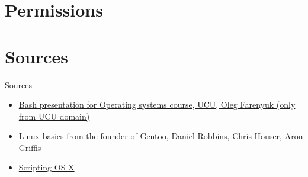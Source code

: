 \documentclass[usenames,dvipsnames,10pt,aspectratio=169]{beamer}
\begin{document}
\section{Permissions}

\section{Sources}
\begin{frame}{Sources}
\begin{itemize}
    \item \href{https://cms.ucu.edu.ua/pluginfile.php/181565/mod_resource/content/3/os_p01_bash.pdf}{Bash presentation for Operating systems course, UCU, Oleg Farenyuk (only from UCU domain)}
    \item \href{https://www.funtoo.org/Linux_Fundamentals,_Part_1}{Linux basics from the founder of Gentoo, Daniel Robbins, Chris Houser, Aron Griffis}
    \item \href {https://scriptingosx.com/}{Scripting OS X}
\end{itemize}    
\end{frame}
\end{document}
